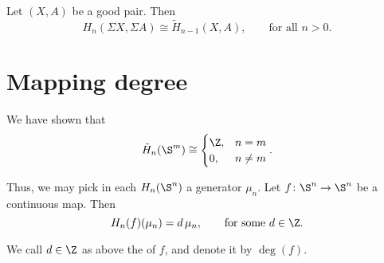\documentclass[main.tex]{subfiles}
\begin{document}
\begin{theorem}
  \label{thm:suspension_isomorphism}
  Let $(X, A)$ be a good pair. Then
  \begin{equation*}
    H_{n}(\Sigma X, \Sigma A) \cong \tilde{H}_{n-1}(X, A),\qquad \text{for all }n > 0.
  \end{equation*}
\end{theorem}

\section{Mapping degree}
\label{sec:mapping_degree}

We have shown that
\begin{equation*}
  \tilde{H}_{n}(\S^{m}) \cong
  \begin{cases}
    \Z, &n = m \\
    0, & n \neq m
  \end{cases}.
\end{equation*}

Thus, we may pick in each $H_{n}(\S^{n})$ a generator $\mu_{n}$. Let $f\colon \S^{n} \to \S^{n}$ be a continuous map. Then
\begin{equation*}
  H_{n}(f)(\mu_{n}) = d\, \mu_{n},\qquad \text{for some }d \in \Z.
\end{equation*}

\begin{definition}
  \label{def:mapping_degree}
  We call $d \in \Z$ as above the  of $f$, and denote it by $\deg(f)$.
\end{definition}
\end{document}
